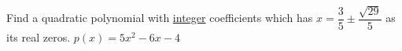 {Find a quadratic polynomial with \underline{integer} coefficients which has $x = \dfrac{3}{5} \pm \dfrac{\sqrt{29}}{5}$ as its real zeros.
}
{$p(x) = 5x^{2} - 6x - 4$
}